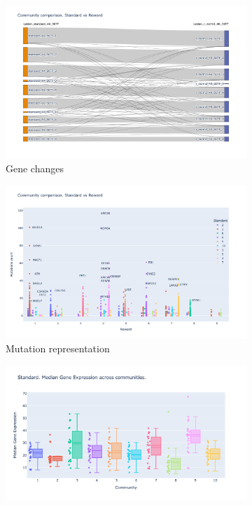 \begin{figure}[!htb]
    \hfill
    \begin{subfigure}[b]{0.49\textwidth}
        \centering
        \includegraphics[width=\textwidth,keepaspectratio]{Sections/Network_I/Resources/P0/Comms/Sky_Comm_Comp_4K.png}
        \caption{Gene changes}
    \end{subfigure}
    \hfill
     \begin{subfigure}[b]{0.49\textwidth}
            \centering
            \includegraphics[width=\textwidth,keepaspectratio]{Sections/Network_I/Resources/P0/Comms/Mut_Comm_Comp_4K.png}
            \caption{Mutation representation}
    \end{subfigure}
    \hfill
    \hfill
    \begin{subfigure}[b]{0.47\textwidth}
        \centering
        \includegraphics[width=\textwidth,keepaspectratio]{Sections/Network_I/Resources/P0/Comms/P0_standard_4K_50TF_med.png}

\end{subfigure}
\end{figure}
